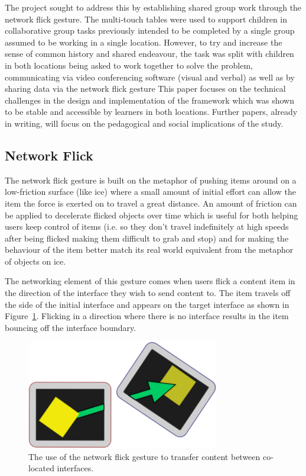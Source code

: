 \documentclass[a4paper,11pt]{article}
\begin{document}
The project sought to address this by establishing shared group work through the network flick gesture.
The multi-touch tables were used to support children in collaborative group tasks previously intended to be completed by a single group assumed to be working in a single location.
However, to try and increase the sense of common history and shared endeavour, the task was split with children in both locations being asked to work together to solve the problem, communicating via video conferencing software (visual and verbal) as well as by sharing data via the network flick gesture
This paper focuses on the technical challenges in the design and implementation of the framework which was shown to be stable and accessible by learners in both locations.
Further papers, already in writing, will focus on the pedagogical and social implications of the study.

\subsection{Network Flick}

The network flick gesture is built on the metaphor of pushing items around on a low-friction surface (like ice) where a small amount of initial effort can allow the item the force is exerted on to travel a great distance.
An amount of friction can be applied to decelerate flicked objects over time which is useful for both helping users keep control of items (i.e.
so they don't travel indefinitely at high speeds after being flicked making them difficult to grab and stop) and for making the behaviour of the item better match its real world equivalent from the metaphor of objects on ice.

The networking element of this gesture comes when users flick a content item in the direction of the interface they wish to send content to.
The item travels off the side of the initial interface and appears on the target interface as shown in Figure~\ref{fig:FlickExample}.
Flicking in a direction where there is no interface results in the item bouncing off the interface boundary.

\begin{figure}[h]
 \centering
   \includegraphics[width=0.75\textwidth]{figures/flickexample.png}
   \caption{The use of the network flick gesture to transfer content between co-located interfaces.}
   \label{fig:FlickExample}
\end{figure}
\end{document}
